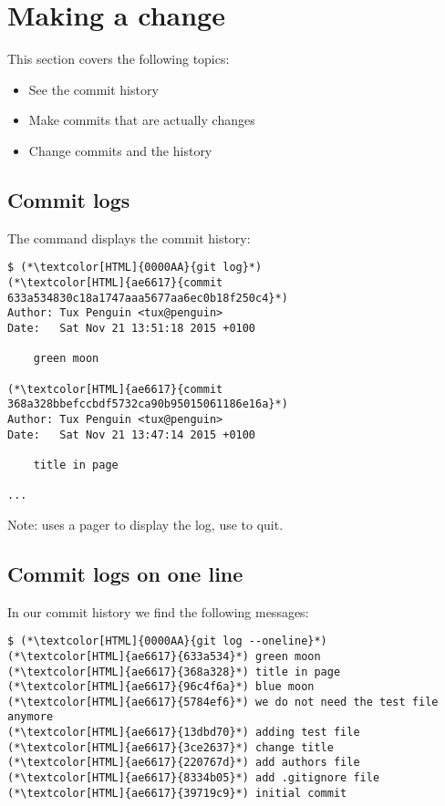 \section{Making a change}
\begin{frame}[fragile]
  \slidetitle

  This section covers the following topics:
  \begin{itemize}
    \item See the commit history
    \item Make commits that are actually changes
    \item Change commits and the history
  \end{itemize}
\end{frame}

\subsection{Commit logs}
\begin{frame}[fragile]
  \subslidetitle

  The command  displays the commit history:
  \begin{lstlisting}
$ (*\textcolor[HTML]{0000AA}{git log}*)
(*\textcolor[HTML]{ae6617}{commit 633a534830c18a1747aaa5677aa6ec0b18f250c4}*)
Author: Tux Penguin <tux@penguin>
Date:   Sat Nov 21 13:51:18 2015 +0100

    green moon

(*\textcolor[HTML]{ae6617}{commit 368a328bbefccbdf5732ca90b95015061186e16a}*)
Author: Tux Penguin <tux@penguin>
Date:   Sat Nov 21 13:47:14 2015 +0100

    title in page

...
\end{lstlisting}
Note:  uses a pager to display the log, use  to quit.
\end{frame}

\subsection{Commit logs on one line}
\begin{frame}[fragile]
  \subslidetitle

  In our commit history we find the following messages:
  \begin{lstlisting}
$ (*\textcolor[HTML]{0000AA}{git log --oneline}*)
(*\textcolor[HTML]{ae6617}{633a534}*) green moon
(*\textcolor[HTML]{ae6617}{368a328}*) title in page
(*\textcolor[HTML]{ae6617}{96c4f6a}*) blue moon
(*\textcolor[HTML]{ae6617}{5784ef6}*) we do not need the test file anymore
(*\textcolor[HTML]{ae6617}{13dbd70}*) adding test file
(*\textcolor[HTML]{ae6617}{3ce2637}*) change title
(*\textcolor[HTML]{ae6617}{220767d}*) add authors file
(*\textcolor[HTML]{ae6617}{8334b05}*) add .gitignore file
(*\textcolor[HTML]{ae6617}{39719c9}*) initial commit
\end{lstlisting}
\end{frame}

